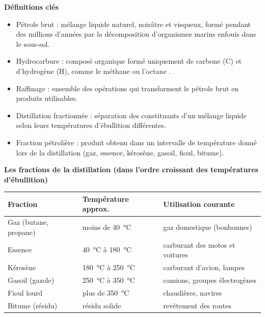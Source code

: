 \documentclass[11pt]{article}
\newcommand{\cle}[1]{{\popxbold\color{popdark}#1}}
\begin{document}
\begin{bilan}
\textbf{D\'efinitions cl\'es}
\begin{itemize}
  \item \cle{P\'etrole brut} : m\'elange liquide naturel, noir\^atre et visqueux, form\'e pendant des millions d'ann\'ees par la d\'ecomposition d'organismes marins enfouis dans le sous-sol.
  \item \cle{Hydrocarbure} : compos\'e organique form\'e uniquement de carbone (C) et d'hydrog\`ene (H), comme le m\'ethane  ou l'octane .
  \item \cle{Raffinage} : ensemble des op\'erations qui transforment le p\'etrole brut en produits utilisables.
  \item \cle{Distillation fractionn\'ee} : s\'eparation des constituants d'un m\'elange liquide selon leurs \cle{temp\'eratures d'\'ebullition} diff\'erentes.
  \item \cle{Fraction p\'etroli\`ere} : produit obtenu dans un intervalle de temp\'erature donn\'e lors de la distillation (gaz, essence, k\'eros\`ene, gasoil, fioul, bitume).
\end{itemize}

\textbf{Les fractions de la distillation (dans l'ordre croissant des temp\'eratures d'\'ebullition)}
\begin{center}
\begin{tabularx}{\linewidth}{|l|X|X|}\hline
\rowcolor{popblueL} \textbf{Fraction} & \textbf{Temp\'erature approx.} & \textbf{Utilisation courante} \\ \hline
Gaz (butane, propane) & moins de \SI{40}{\celsius} & gaz domestique (bonbonnes) \\ \hline
Essence & \SI{40}{\celsius} \`a \SI{180}{\celsius} & carburant des motos et voitures \\ \hline
K\'eros\`ene & \SI{180}{\celsius} \`a \SI{250}{\celsius} & carburant d'avion, lampes \\ \hline
Gasoil (gazole) & \SI{250}{\celsius} \`a \SI{350}{\celsius} & camions, groupes \'electrog\`enes \\ \hline
Fioul lourd & plus de \SI{350}{\celsius} & chaudi\`eres, navires \\ \hline
Bitume (r\'esidu) & r\'esidu solide & rev\^etement des routes \\ \hline
\end{tabularx}
\end{center}


\end{bilan}
\end{document}
